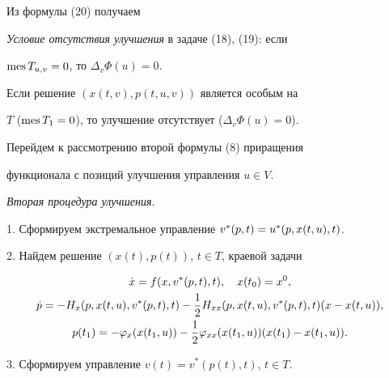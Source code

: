 Из формулы (20) получаем


\medskip





{\it Условие отсутствия улучшения} в задаче (18), (19): если


$\operatorname{mes} T_{u,v}=0$, то $\Delta_v\Phi(u)=0$.





\begin{cor}


Если решение $(x(t,v),p(t,u,v))$ является особым на 


$T$ ($\operatorname{mes} T_1=0$), то улучшение отсутствует ($\Delta_v\Phi(u)=0$).


\end{cor}





Перейдем к рассмотрению второй формулы (8) приращения 


функционала с позиций улучшения управления $u\in V$.


\medskip





{\it Вторая процедура улучшения}.


1. Сформируем экстремальное управление $v^*(p,t)=\linebreak u^*(p,x(t,u),t)$.





2. Найдем решение $(x(t),p(t))$, $t\in T$, краевой задачи


\begin{gather}


\Dot x=f(x,v^*(p,t),t),\quad x(t_0)=x^0,\\


%


\Dot p=-H_x(p,x(t,u),v^*(p,t),t)-\frac{1}{2}


H_{xx}(p,x(t,u),v^*(p,t),t)(x-x(t,u)),\notag \\


%


p(t_1)=-\varphi_x(x(t_1,u))-\frac{1}{2}\varphi_{xx}


(x(t_1,u))(x(t_1)-x(t_1,u)).


\end{gather}





3. Сформируем управление $v(t)=v^*(p(t),t)$, $t\in T$.


